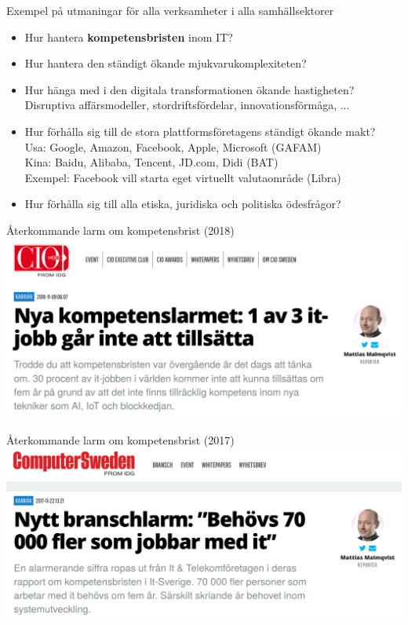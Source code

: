 \documentclass[aspectratio=169]{beamer}
\newenvironment{Slide}[1]%
  {\begin{frame}[environment=Slide]{#1}}
  {\end{frame}}%
\begin{document}
\begin{Slide}{Exempel på utmaningar för alla verksamheter i alla samhällsektorer}
  \begin{itemize}
    \item Hur hantera \textbf{kompetensbristen} inom IT?
    \item Hur hantera den ständigt ökande mjukvarukomplexiteten?
    \item Hur hänga med i den digitala transformationen ökande hastigheten? \\ Disruptiva affärsmodeller, stordriftsfördelar, innovationsförmåga, ... 
    \item Hur förhålla sig till de stora plattformsföretagens ständigt ökande makt? \\ 
          Usa: Google, Amazon, Facebook, Apple, Microsoft \hfill(GAFAM)\\
          Kina: Baidu, Alibaba, Tencent, JD.com, Didi \hfill (BAT) \\
          Exempel: Facebook vill starta eget virtuellt valutaområde (Libra)
    \item Hur förhålla sig till alla etiska, juridiska och politiska ödesfrågor?
  \end{itemize}
\end{Slide}


\begin{Slide}{Återkommande larm om kompetensbrist (2018)}
\includegraphics[height=0.75\textheight]{../../img/kompetenslarm-cio}
\end{Slide}

\begin{Slide}{Återkommande larm om kompetensbrist (2017)}
\includegraphics[height=0.75\textheight]{../../img/kompetenslarm-cs}
\end{Slide}
\end{document}

